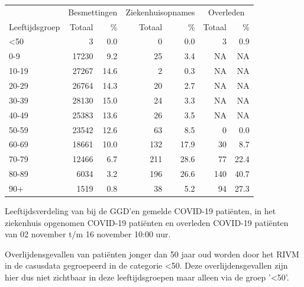 \documentclass[
  english,
  man,floatsintext]{apa6}
\begin{document}
\begin{table}
\centering\begingroup\fontsize{11}{13}\selectfont

\begin{threeparttable}
\begin{tabular}{lrrrrrr}
\toprule
\multicolumn{1}{c}{ } & \multicolumn{2}{c}{Besmettingen} & \multicolumn{2}{c}{Ziekenhuisopnames} & \multicolumn{2}{c}{Overleden} \\
\cmidrule(l{3pt}r{3pt}){2-3} \cmidrule(l{3pt}r{3pt}){4-5} \cmidrule(l{3pt}r{3pt}){6-7}
Leeftijdsgroep & Totaal & \% & Totaal & \% & Totaal & \%\\
\midrule
<50 & 3 & 0.0 & 0 & 0.0 & 3 & 0.9\\
0-9 & 17230 & 9.2 & 25 & 3.4 & NA & NA\\
10-19 & 27267 & 14.6 & 2 & 0.3 & NA & NA\\
20-29 & 26764 & 14.3 & 20 & 2.7 & NA & NA\\
30-39 & 28130 & 15.0 & 24 & 3.3 & NA & NA\\
40-49 & 25383 & 13.6 & 26 & 3.5 & NA & NA\\
50-59 & 23542 & 12.6 & 63 & 8.5 & 0 & 0.0\\
60-69 & 18661 & 10.0 & 132 & 17.9 & 30 & 8.7\\
70-79 & 12466 & 6.7 & 211 & 28.6 & 77 & 22.4\\
80-89 & 6034 & 3.2 & 196 & 26.6 & 140 & 40.7\\
90+ & 1519 & 0.8 & 38 & 5.2 & 94 & 27.3\\
\bottomrule
\end{tabular}
\begin{tablenotes}
\item[1] Leeftijdsverdeling van bij de GGD’en gemelde COVID-19 patiënten, in het ziekenhuis opgenomen COVID-19 patiënten en overleden COVID-19 patiënten van 02 november t/m 16 november 10:00 uur.
\item[2] Overlijdensgevallen van patiënten jonger dan 50 jaar oud worden door het RIVM in de casusdata gegroepeerd in de categorie <50. Deze overlijdensgevallen zijn hier dus niet zichtbaar in deze leeftijdsgroepen maar alleen via de groep '<50'.
\end{tablenotes}
\end{threeparttable}
\endgroup{}
\end{table}

\newpage
\end{document}

